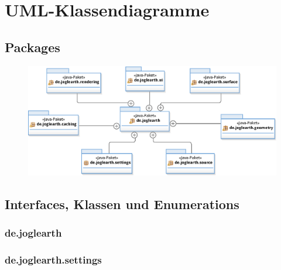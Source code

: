 \documentclass[10pt]{scrreprt}
\begin{document}
\chapter{UML-Klassendiagramme}

\section{Packages}

\begin{figure}[!htb]
\begin{center}
	\includegraphics[scale=0.55]{Pakete.eps}
\end{center}
\end{figure}

\section{Interfaces, Klassen und Enumerations}

\subsection*{de.joglearth}

\subsection*{de.joglearth.settings}
\end{document}
